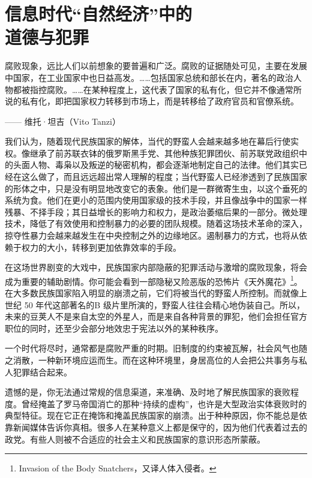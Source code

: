 \chapter[信息时代“自然经济”中的道德与犯罪]{信息时代“自然经济”中的\\道德与犯罪}

\begin{tcolorbox}
腐败现象，远比人们以前想象的要普遍和广泛。腐败的证据随处可见，主要在发展中国家，在工业国家中也日益高发。……包括国家总统和部长在内，著名的政治人物都被指控腐败。……在某种程度上，这代表了国家的私有化，但它并不像通常所说的私有化，即把国家权力转移到市场上，而是转移给了政府官员和官僚系统。
\begin{flushright}
—— 维托·坦吉（Vito Tanzi）
\end{flushright}
\end{tcolorbox}


我们认为，随着现代民族国家的解体，当代的野蛮人会越来越多地在幕后行使实权。像继承了前苏联衣钵的俄罗斯黑手党、其他种族犯罪团伙、前苏联党政组织中的头面人物、毒枭以及叛逆的秘密机构，都会逐渐地制定自己的法律。他们其实已经在这么做了，而且远远超出常人理解的程度；当代野蛮人已经渗透到了民族国家的形体之中，只是没有明显地改变它的表象。他们是一群微寄生虫，以这个垂死的系统为食。他们在更小的范围内使用国家级的技术手段，并且像战争中的国家一样残暴、不择手段；其日益增长的影响力和权力，是政治萎缩后果的一部分。微处理技术，降低了有效使用和控制暴力的必要的团队规模。随着这场技术革命的深入，掠夺性暴力会越来越发生在中央控制之外的边缘地区。遏制暴力的方式，也将从依赖于权力的大小，转移到更加依靠效率的手段。

在这场世界剧变的大戏中，民族国家内部隐蔽的犯罪活动与激增的腐败现象，将会成为重要的辅助剧情。你可能会看到一部隐秘又险恶版的恐怖片《天外魔花》\footnote{Invasion of the Body Snatchers，又译人体入侵者。}。在大多数民族国家陷入明显的崩溃之前，它们将被当代的野蛮人所控制。而就像上世纪 50 年代这部著名的B 级片里所演的，野蛮人往往会精心地伪装自己。所以，未来的豆荚人不是来自太空的外星人，而是来自各种背景的罪犯，他们会担任官方职位的同时，还至少会部分地效忠于宪法以外的某种秩序。

一个时代将尽时，通常都是腐败严重的时期。旧制度的约束被瓦解，社会风气也随之消散，一种新环境应运而生。而在这种环境里，身居高位的人会把公共事务与私人犯罪结合起来。

遗憾的是，你无法通过常规的信息渠道，来准确、及时地了解民族国家的衰败程度。曾经掩盖了罗马帝国消亡的那种“持续的虚构”，也许是大型政治实体衰败时的典型特征。现在它正在掩饰和掩盖民族国家的崩溃。出于种种原因，你不能总是依靠新闻媒体告诉你真相。很多人在某种意义上都是保守的，因为他们代表着过去的政党。有些人则被不合适应的社会主义和民族国家的意识形态所蒙蔽。

